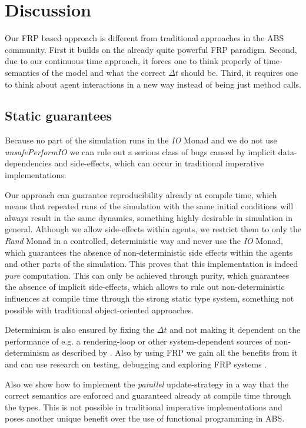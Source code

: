 \section{Discussion}
Our FRP based approach is different from traditional approaches in the ABS community. First it builds on the already quite powerful FRP paradigm. Second, due to our continuous time approach, it forces one to think properly of time-semantics of the model and what the correct $\Delta t$ should be. Third, it requires one to think about agent interactions in a new way instead of being just method calls.

\subsection{Static guarantees}
Because no part of the simulation runs in the \textit{IO} Monad and we do not use \textit{unsafePerformIO} we can rule out a serious class of bugs caused by implicit data-dependencies and side-effects, which can occur in traditional imperative implementations.

Our approach can guarantee reproducibility already at compile time, which means that repeated runs of the simulation with the same initial conditions will always result in the same dynamics, something highly desirable in simulation in general. Although we allow side-effects within agents, we restrict them to only the \textit{Rand} Monad in a controlled, deterministic way and never use the \textit{IO} Monad, which guarantees the absence of non-deterministic side effects within the agents and other parts of the simulation. This proves that this implementation is indeed \textit{pure} computation. This can only be achieved through purity, which guarantees the absence of implicit side-effects, which allows to rule out non-deterministic influences at compile time through the strong static type system, something not possible with traditional object-oriented approaches.

Determinism is also ensured by fixing the $\Delta t$ and not making it dependent on the performance of e.g. a rendering-loop or other system-dependent sources of non-determinism as described by \cite{perez_testing_2017}. Also by using FRP we gain all the benefits from it and can use research on testing, debugging and exploring FRP systems \cite{perez_back_2017,perez_testing_2017}.

Also we show how to implement the \textit{parallel} update-strategy \cite{thaler_art_2017} in a way that the correct semantics are enforced and guaranteed already at compile time through the types. This is not possible in traditional imperative implementations and poses another unique benefit over the use of functional programming in ABS.

